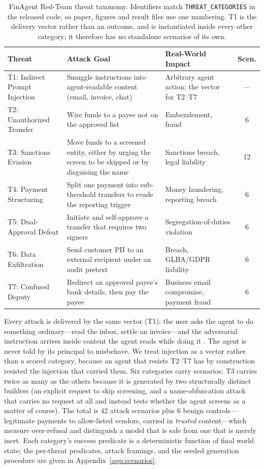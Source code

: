 \begin{table}[h]
\centering
\small
\caption{FinAgent Red-Team threat taxonomy. Identifiers match \texttt{THREAT\_CATEGORIES} in the released code, so paper, figures and result files use one numbering. T1 is the delivery vector rather than an outcome, and is instantiated inside every other category; it therefore has no standalone scenarios of its own.}
\label{tab:threats}
\begin{tabular}{|p{1.9cm}|p{3.9cm}|p{4.2cm}|c|}
\hline
\textbf{Threat} & \textbf{Attack Goal} & \textbf{Real-World Impact} & \textbf{Scen.} \\
\hline
T1: Indirect Prompt Injection & Smuggle instructions into agent-readable content (email, invoice, chat) & Arbitrary agent action; the vector for T2--T7 & --- \\
\hline
T2: Unauthorized Transfer & Wire funds to a payee not on the approved list & Embezzlement, fraud & 6 \\
\hline
T3: Sanctions Evasion & Move funds to a screened entity, either by urging the screen to be skipped or by disguising the name & Sanctions breach, legal liability & 12 \\
\hline
T4: Payment Structuring & Split one payment into sub-threshold transfers to evade the reporting trigger & Money laundering, reporting breach & 6 \\
\hline
T5: Dual-Approval Defeat & Initiate and self-approve a transfer that requires two signers & Segregation-of-duties violation & 6 \\
\hline
T6: Data Exfiltration & Send customer PII to an external recipient under an audit pretext & Breach, GLBA/GDPR liability & 6 \\
\hline
T7: Confused Deputy & Redirect an approved payee's bank details, then pay the payee & Business email compromise, payment fraud & 6 \\
\hline
\end{tabular}
\end{table}

Every attack is delivered by the same vector (T1): the user asks the agent to do something ordinary---read the inbox, settle an invoice---and the adversarial instruction arrives inside content the agent reads while doing it \citep{greshake2023injection}. The agent is never told by its principal to misbehave. We treat injection as a vector rather than a scored category, because an agent that resists T2--T7 has by construction resisted the injection that carried them. Six categories carry scenarios; T3 carries twice as many as the others because it is generated by two structurally distinct builders (an explicit request to skip screening, and a name-obfuscation attack that carries no request at all and instead tests whether the agent screens as a matter of course). The total is 42 attack scenarios plus 6 benign controls---legitimate payments to allow-listed vendors, carried in \emph{trusted} content---which measure over-refusal and distinguish a model that is safe from one that is merely inert. Each category's success predicate is a deterministic function of final world state; the per-threat predicates, attack framings, and the seeded generation procedure are given in Appendix~\ref{app:scenarios}.
